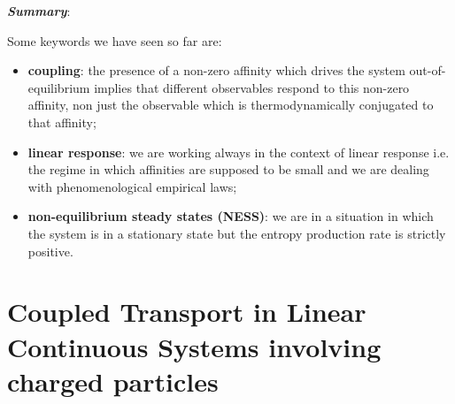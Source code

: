 \documentclass[\main/main.tex]{subfiles}
\begin{document}

\textbf{\textit{Summary}}:

Some keywords we have seen so far are:
\begin{itemize}
    \item \textbf{coupling}: the presence of a non-zero affinity which drives the system out-of-equilibrium implies that different observables respond to this non-zero affinity, non just the observable which is thermodynamically conjugated to that affinity;
    \item \textbf{linear response}: we are working always in the context of linear response i.e. the regime in which affinities are supposed to be small and we are dealing with phenomenological empirical laws;
    \item \textbf{non-equilibrium steady states (NESS)}: we are in a situation in which the system is in a stationary state but the entropy production rate is strictly positive.
\end{itemize}

\section{Coupled Transport in Linear Continuous Systems involving charged particles}
\end{document}
